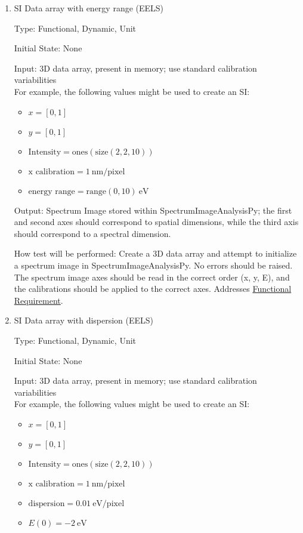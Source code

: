 \documentclass[12pt, titlepage]{article}
\newcommand{\progname}{SpectrumImageAnalysisPy}
\begin{document}
\begin{enumerate}

\item{SI Data array with energy range (EELS)}

Type: Functional, Dynamic, Unit

Initial State: None

Input: 3D data array, present in memory; use standard calibration
variabilities\\
For example, the following values might be used to create an SI: 
\begin{itemize}
	\item $x = [0, 1]$
	\item $y = [0, 1]$
	\item $\text{Intensity} = \text{ones}(\text{size}(2,2,10))$
	\item $\text{x calibration} = 1\ \si{\nano\metre}/\text{pixel}$
	\item $\text{energy range} = \text{range}(0, 10)\ \si{\electronvolt}$
\end{itemize}

Output: Spectrum Image stored within \progname{}; the first and second axes
should correspond to spatial dimensions, while the third axis should correspond
to a spectral dimension.

How test will be performed: Create a 3D data array and attempt to initialize a
spectrum image in \progname{}. No errors should be raised. The spectrum image
axes should be read in the correct order (x, y, E), and the calibrations should
be applied to the correct axes. Addresses \hyperref[R_SI_inputs]{Functional
Requirement}.


\item{SI Data array with dispersion (EELS)}

Type: Functional, Dynamic, Unit

Initial State: None

Input: 3D data array, present in memory; use standard calibration
variabilities\\
For example, the following values might be used to create an SI: 
\begin{itemize}
	\item $x = [0, 1]$
	\item $y = [0, 1]$
	\item $\text{Intensity} = \text{ones}(\text{size}(2,2,10))$
	\item $\text{x calibration} = 1\ \si{\nano\metre}/\text{pixel}$
	\item $\text{dispersion} = 0.01\ \si{\electronvolt}/\text{pixel}$
	\item $E(0) = -2\ \si{\electronvolt}$
\end{itemize}


\end{enumerate}
\end{document}
